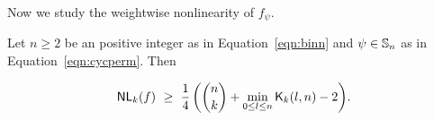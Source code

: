 \documentclass{llncs}
\begin{document}
Now we study the weightwise nonlinearity of $f_\psi$.
\iffalse
\begin{lemma} \label{lem:setSize_k}
For $n \geq 2$ as in Equation~\ref{eqn:binn}, let $\psi \in \Sn$ be the permutation as defined in Equation~\ref{eqn:cycperm}.Then 
$$\left| \{x \in \Ekn{n}{k} \setminus \orbs_o : c \cdot (x + \psi(x))= 1\} \right| 
= \frac{1}{2} (|\Ekn{n}{k}| - \kraw{k}{l}{n})$$
where $l = \w(c+\psi^{-1}(c))$.
\end{lemma}
\begin{proof}
Let $x = (x_1,x_2, \ldots,x_n) \in \Ekn{n}{k}$ and $c = (c_1,c_2,\ldots,c_n) \in \F_2^n$. Then as in Equation~\ref{eqn:cx2}, we have 
\begin{eqnarray*}
c \cdot (x+\psi(x)) & = & (c+\psi^{-1}(c)) \cdot x \label{eqn:cxk2}
\end{eqnarray*}
is a linear function on $n$ variable defined over the slice $\Ekn{n}{k}$.
Therefore, using Theorem~\ref{thm:Kraw}, we have
$$\left| \{x \in \Ekn{n}{k} : c \cdot (x + \psi(x))= 1\} \right| = \wkn{n}{k}((c+\psi^{-1}(c)) \cdot x) = \frac{1}{2} (|\Ekn{n}{k}| - \kraw{k}{l}{n})$$
where $l = \w(c+\psi^{-1}(c))$.
If $x \in \Ekn{n}{k}$ and $|\orbs_\psi(x)| = 1$ i.e., $x \in \Ekn{n}{k} \cap \orbs_o$ then $c \cdot (x+\psi(x)) = 0$. Hence,
$$\left| \{x \in \Ekn{n}{k} \setminus \orbs_o : c \cdot (x + \psi(x))= 1\} \right| 
= \frac{1}{2} (|\Ekn{n}{k}| - \kraw{k}{l}{n}).$$
\end{proof}
\fi
\begin{theorem}
Let $n \geq 2$ be an positive integer as in Equation~\ref{eqn:binn} and $\psi \in \Sn$ as in Equation~\ref{eqn:cycperm}.
Then 
\iffalse
$$\NLk{k}(f) ~\geq ~ 
\left\{ \begin{array}{ll}
\displaystyle{\frac{1}{4}\left({n \choose k} + \min_{0 \leq l \leq n} \kraw{k}{l}{n}\right)}  & \text{ if }  k \not\preceq n \\
\displaystyle{\frac{1}{4}\left({n \choose k} + \min_{0 \leq l \leq n} \kraw{k}{l}{n} - 2\right)} & \text{ if } k \preceq n.
\end{array}   \right.$$
\fi
$$\mathsf{NL}_{k}(f) ~\geq ~ 
\displaystyle{\frac{1}{4}\left({n \choose k} + \min_{0 \leq l \leq n} \mathsf{K}_{k}(l,n)-2\right)}.$$
\end{theorem}
\iffalse
\end{document}
